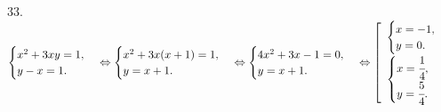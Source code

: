 33. $\begin{cases} x^2+3xy=1,\\ y-x=1.\end{cases}\Leftrightarrow\begin{cases} x^2+3x(x+1)=1,\\ y=x+1.\end{cases}
\Leftrightarrow\begin{cases} 4x^2+3x-1=0,\\ y=x+1.\end{cases}\Leftrightarrow\left[\begin{array}{l}\begin{cases} x=-1,\\ y=0.\end{cases}\\ \begin{cases} x=\cfrac{1}{4},\\ y=\cfrac{5}{4}.\end{cases}\end{array}\right.$\\
